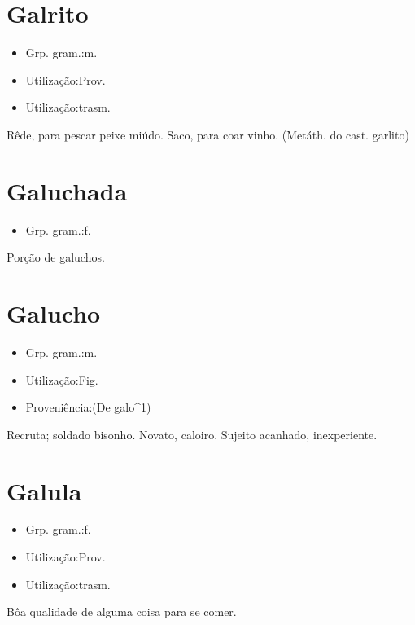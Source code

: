 \section{Galrito}
\begin{itemize}
\item {Grp. gram.:m.}
\end{itemize}
\begin{itemize}
\item {Utilização:Prov.}
\end{itemize}
\begin{itemize}
\item {Utilização:trasm.}
\end{itemize}
Rêde, para pescar peixe miúdo.
Saco, para coar vinho.
(Metáth. do cast. \textunderscore garlito\textunderscore )
\section{Galuchada}
\begin{itemize}
\item {Grp. gram.:f.}
\end{itemize}
Porção de galuchos.
\section{Galucho}
\begin{itemize}
\item {Grp. gram.:m.}
\end{itemize}
\begin{itemize}
\item {Utilização:Fig.}
\end{itemize}
\begin{itemize}
\item {Proveniência:(De \textunderscore galo\textunderscore ^1)}
\end{itemize}
Recruta; soldado bisonho.
Novato, caloiro.
Sujeito acanhado, inexperiente.
\section{Galula}
\begin{itemize}
\item {Grp. gram.:f.}
\end{itemize}
\begin{itemize}
\item {Utilização:Prov.}
\end{itemize}
\begin{itemize}
\item {Utilização:trasm.}
\end{itemize}
Bôa qualidade de alguma coisa para se comer.
